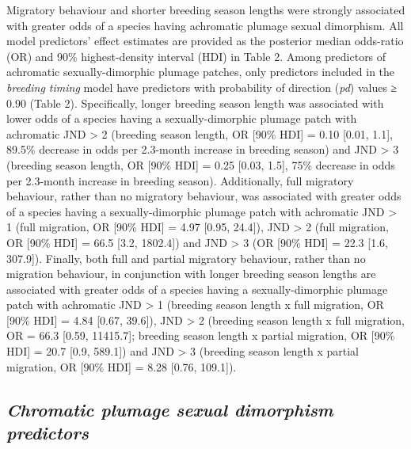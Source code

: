 \documentclass[
  a4paper,
]{article}
\begin{document}
Migratory behaviour and shorter breeding season lengths were strongly
associated with greater odds of a species having achromatic plumage
sexual dimorphism. All model predictors' effect estimates are provided
as the posterior median odds-ratio (OR) and 90\% highest-density
interval (HDI) in Table 2. Among predictors of achromatic
sexually-dimorphic plumage patches, only predictors included in the
\emph{breeding timing} model have predictors with probability of
direction (\emph{pd}) values ≥ 0.90 (Table 2). Specifically, longer
breeding season length was associated with lower odds of a species
having a sexually-dimorphic plumage patch with achromatic JND
\textgreater{} 2 (breeding season length, OR {[}90\% HDI{]} = 0.10
{[}0.01, 1.1{]}, 89.5\% decrease in odds per 2.3-month increase in
breeding season) and JND \textgreater{} 3 (breeding season length, OR
{[}90\% HDI{]} = 0.25 {[}0.03, 1.5{]}, 75\% decrease in odds per
2.3-month increase in breeding season). Additionally, full migratory
behaviour, rather than no migratory behaviour, was associated with
greater odds of a species having a sexually-dimorphic plumage patch with
achromatic JND \textgreater{} 1 (full migration, OR {[}90\% HDI{]} =
4.97 {[}0.95, 24.4{]}), JND \textgreater{} 2 (full migration, OR {[}90\%
HDI{]} = 66.5 {[}3.2, 1802.4{]}) and JND \textgreater{} 3 (OR {[}90\%
HDI{]} = 22.3 {[}1.6, 307.9{]}). Finally, both full and partial
migratory behaviour, rather than no migration behaviour, in conjunction
with longer breeding season lengths are associated with greater odds of
a species having a sexually-dimorphic plumage patch with achromatic JND
\textgreater{} 1 (breeding season length x full migration, OR {[}90\%
HDI{]} = 4.84 {[}0.67, 39.6{]}), JND \textgreater{} 2 (breeding season
length x full migration, OR = 66.3 {[}0.59, 11415.7{]}; breeding season
length x partial migration, OR {[}90\% HDI{]} = 20.7 {[}0.9, 589.1{]})
and JND \textgreater{} 3 (breeding season length x partial migration, OR
{[}90\% HDI{]} = 8.28 {[}0.76, 109.1{]}).

\hypertarget{chromatic-plumage-sexual-dimorphism-predictors}{%
\subsection{\texorpdfstring{\emph{Chromatic plumage sexual dimorphism
predictors}}{Chromatic plumage sexual dimorphism predictors}}\label{chromatic-plumage-sexual-dimorphism-predictors}}
\end{document}
